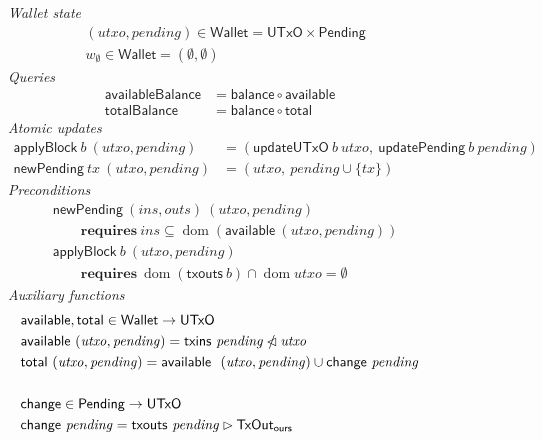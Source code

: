 \documentclass{article}
\newcommand{\restrictdom}{\lhd}
\newcommand{\subtractdom}{\mathbin{\slashed{\restrictdom}}}
\newcommand{\restrictrange}{\rhd}
\DeclareMathOperator{\dom}{dom}
\theoremstyle{definition}{
  \newtheorem{lemma}{Lemma}[section] %
  \newtheorem{definition}[lemma]{Definition}
}
\theoremstyle{theorem}{
  \newtheorem{invariant}[lemma]{Invariant}
  \newtheorem{proofobligation}[lemma]{Proof Obligation}
}
\numberwithin{equation}{lemma}
\begin{document}
\begin{figure}
\emph{Wallet state}
\begin{align*}
& (\mathit{utxo}, \mathit{pending}) \in \mathsf{Wallet} = \mathsf{UTxO} \times \mathsf{Pending} \\
& w_\emptyset \in \mathsf{Wallet} = (\emptyset, \emptyset)
\end{align*}
%
\emph{Queries}
%
\begin{equation*}
\begin{split}
\mathsf{availableBalance} & = \mathsf{balance} \circ \mathsf{available} \\
\mathsf{totalBalance}     & = \mathsf{balance} \circ \mathsf{total}
\end{split}
\end{equation*}
%
\emph{Atomic updates}
%
\begin{align*}
    \mathsf{applyBlock} ~ b ~ (\mathit{utxo}, \mathit{pending})
& = (\mathsf{updateUTxO} ~ b ~ \mathit{utxo}, ~ \mathsf{updatePending} ~ b ~ \mathit{pending})
\\
  \mathsf{newPending} ~ \mathit{tx} ~ (\mathit{utxo}, \mathit{pending})
& = ( \mathit{utxo}, ~ \mathit{pending} \cup \{ \mathit{tx} \} )
\end{align*}
%
\emph{Preconditions}
%
\begin{align*}
& \mathsf{newPending} ~ (\mathit{ins}, \mathit{outs}) ~ (\mathit{utxo}, \mathit{pending}) \\
& \qquad \mathbf{requires~} \mathit{ins} \subseteq \dom (\mathsf{available} ~ (\mathit{utxo}, \mathit{pending}))
\\
& \mathsf{applyBlock} ~ b ~ (\mathit{utxo}, \mathit{pending}) \\
& \qquad \mathbf{requires~} \dom (\mathsf{txouts} ~ b) \cap \dom \mathit{utxo} = \emptyset
\end{align*}
%
\emph{Auxiliary functions}
%
\begin{align*}
& \mathsf{available}, \mathsf{total} \in \mathsf{Wallet} \to \mathsf{UTxO} \\
& \mathsf{available} ~ (\mathit{utxo}, \mathit{pending}) = \mathsf{txins} ~ \mathit{pending} \subtractdom \mathit{utxo} \\
& \mathsf{total} ~ (\mathit{utxo}, \mathit{pending}) = \mathsf{available} ~ ~ (\mathit{utxo}, \mathit{pending}) \cup \mathsf{change} ~ \mathit{pending} \\
\\
& \mathsf{change} \in \mathsf{Pending} \to \mathsf{UTxO} \\
& \mathsf{change} ~ \mathit{pending} = \mathsf{txouts} ~ \mathit{pending} \restrictrange \mathsf{TxOut_{ours}} \\

\end{align*}
\end{figure}
\end{document}
